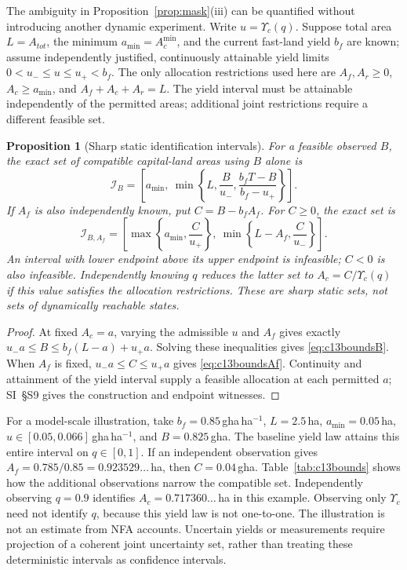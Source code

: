 \documentclass[preprint,12pt,authoryear]{elsarticle}
\newtheorem{proposition}{Proposition}
\newcommand{\Ups}{\Upsilon_c}
\newcommand{\Acmin}{A_c^{\min}}
\begin{document}
The ambiguity in Proposition~\ref{prop:mask}(iii) can be quantified without introducing another dynamic experiment. Write $u=\Ups(q)$. Suppose total area $L=A_{tot}$, the minimum $a_{\min}=\Acmin$, and the current fast-land yield $b_f$ are known; assume independently justified, continuously attainable yield limits $0<u_-\le u\le u_+<b_f$. The only allocation restrictions used here are $A_f,A_r\ge0$, $A_c\ge a_{\min}$, and $A_f+A_c+A_r=L$. The yield interval must be attainable independently of the permitted areas; additional joint restrictions require a different feasible set.

\begin{proposition}[Sharp static identification intervals]\label{prop:c13ident}
For a feasible observed $B$, the exact set of compatible capital-land areas using $B$ alone is
\begin{equation}\label{eq:c13boundsB}
\mathcal I_B=\left[a_{\min},\ \min\left\{L,\frac{B}{u_-},\frac{b_fT-B}{b_f-u_+}\right\}\right].
\end{equation}
If $A_f$ is also independently known, put $C=B-b_fA_f$. For $C\ge0$, the exact set is
\begin{equation}\label{eq:c13boundsAf}
\mathcal I_{B,A_f}=\left[\max\left\{a_{\min},\frac{C}{u_+}\right\},\ \min\left\{L-A_f,\frac{C}{u_-}\right\}\right].
\end{equation}
An interval with lower endpoint above its upper endpoint is infeasible; $C<0$ is also infeasible. Independently knowing $q$ reduces the latter set to $A_c=C/\Ups(q)$ if this value satisfies the allocation restrictions. These are sharp static sets, not sets of dynamically reachable states.
\end{proposition}
\begin{proof}
At fixed $A_c=a$, varying the admissible $u$ and $A_f$ gives exactly $u_-a\le B\le b_f(L-a)+u_+a$. Solving these inequalities gives \eqref{eq:c13boundsB}. When $A_f$ is fixed, $u_-a\le C\le u_+a$ gives \eqref{eq:c13boundsAf}. Continuity and attainment of the yield interval supply a feasible allocation at each permitted $a$; SI~\S S9 gives the construction and endpoint witnesses.
\end{proof}

For a model-scale illustration, take $b_f=0.85$\,gha\,ha$^{-1}$, $L=2.5$\,ha, $a_{\min}=0.05$\,ha, $u\in[0.05,0.066]$\,gha\,ha$^{-1}$, and $B=0.825$\,gha. The baseline yield law attains this entire interval on $q\in[0,1]$. If an independent observation gives $A_f=0.785/0.85=0.923529\ldots$\,ha, then $C=0.04$\,gha. Table~\ref{tab:c13bounds} shows how the additional observations narrow the compatible set. Independently observing $q=0.9$ identifies $A_c=0.717360\ldots$\,ha in this example. Observing only $\Ups$ need not identify $q$, because this yield law is not one-to-one. The illustration is not an estimate from NFA accounts. Uncertain yields or measurements require projection of a coherent joint uncertainty set, rather than treating these deterministic intervals as confidence intervals.
\end{document}
